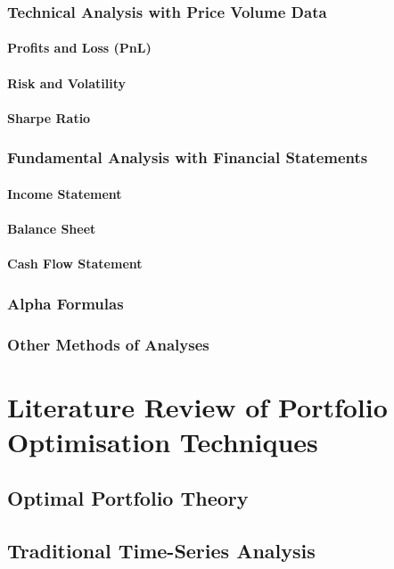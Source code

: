 \documentclass[a4paper,12pt]{report}
\numberwithin{equation}{section}
\theoremstyle{definition}
\begin{document}
\subsection{Technical Analysis with Price Volume Data}
\subsubsection{Profits and Loss (PnL)}
\subsubsection{Risk and Volatility}
\subsubsection{Sharpe Ratio}
\subsection{Fundamental Analysis with Financial Statements}
\subsubsection{Income Statement}
\subsubsection{Balance Sheet}
\subsubsection{Cash Flow Statement}
\subsection{Alpha Formulas}
\subsection{Other Methods of Analyses}

\chapter{Literature Review of Portfolio Optimisation Techniques}
\section{Optimal Portfolio Theory}
\section{Traditional Time-Series Analysis}
\end{document}
